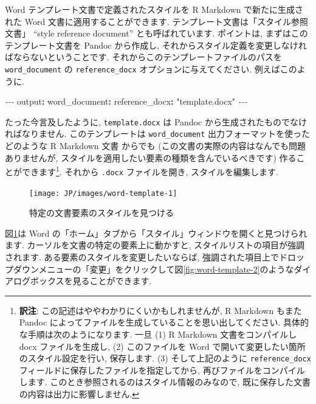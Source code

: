 \documentclass[
  11pt,
  lualatex,ja=standard,jafont=noto]{bxjsreport}
\newenvironment{Shaded}{\begin{snugshade}}{\end{snugshade}}
\newcommand{\AttributeTok}[1]{\textcolor[rgb]{0.77,0.63,0.00}{#1}}
\newcommand{\FunctionTok}[1]{\textcolor[rgb]{0.00,0.00,0.00}{#1}}
\newcommand{\KeywordTok}[1]{\textcolor[rgb]{0.13,0.29,0.53}{\textbf{#1}}}
\newcommand{\PreprocessorTok}[1]{\textcolor[rgb]{0.56,0.35,0.01}{\textit{#1}}}
\newcommand{\StringTok}[1]{\textcolor[rgb]{0.31,0.60,0.02}{#1}}
\begin{document}
Word テンプレート文書で定義されたスタイルを R Markdown で新たに生成された Word 文書に適用することができます. テンプレート文書は「スタイル参照文書」 ``style reference document'' とも呼ばれています. ポイントは, まずはこのテンプレート文書を Pandoc から作成し, それからスタイル定義を変更しなければならないということです. それからこのテンプレートファイルのパスを \texttt{word\_document} の \texttt{reference\_docx} オプションに与えてください. 例えばこのように.

\begin{Shaded}
\begin{Highlighting}[]
\PreprocessorTok{{-}{-}{-}}
\FunctionTok{output}\KeywordTok{:}
\AttributeTok{  }\FunctionTok{word\_document}\KeywordTok{:}
\AttributeTok{    }\FunctionTok{reference\_docx}\KeywordTok{:}\AttributeTok{ }\StringTok{"template.docx"}
\PreprocessorTok{{-}{-}{-}}
\end{Highlighting}
\end{Shaded}

たった今言及したように, \texttt{template.docx} は Pandoc から生成されたものでなければなりません. このテンプレートは \texttt{word\_document} 出力フォーマットを使ったどのような R Markdown 文書 からでも (この文書の実際の内容はなんでも問題ありませんが, スタイルを適用したい要素の種類を含んでいるべきです) 作ることができます\footnote{\textbf{訳注}: この記述はややわかりにくいかもしれませんが, R Markdown もまた Pandoc によってファイルを生成していることを思い出してください. 具体的な手順は次のようになります. 一旦 (1) R Markdown 文書をコンパイルし docx ファイルを生成し, (2) このファイルを Word で開いて変更したい箇所のスタイル設定を行い, 保存します. (3) そして上記のように \texttt{reference\_docx} フィールドに保存したファイルを指定してから, 再びファイルをコンパイルします. このとき参照されるのはスタイル情報のみなので, 既に保存した文書の内容は出力に影響しません.}. それから \texttt{.docx} ファイルを開き, スタイルを編集します.

\begin{figure}

{\centering \texttt{[image: JP/images/word-template-1]} 

}

\caption{特定の文書要素のスタイルを見つける}\label{fig:word-template-1}
\end{figure}

図\ref{fig:word-template-1}は Word の「ホーム」タブから「スタイル」ウィンドウを開くと見つけられます. カーソルを文書の特定の要素上に動かすと, スタイルリストの項目が強調されます. ある要素のスタイルを変更したいならば, 強調された項目上でドロップダウンメニューの「変更」をクリックして図\ref{fig:word-template-2}のようなダイアログボックスを見ることができます.
\end{document}
